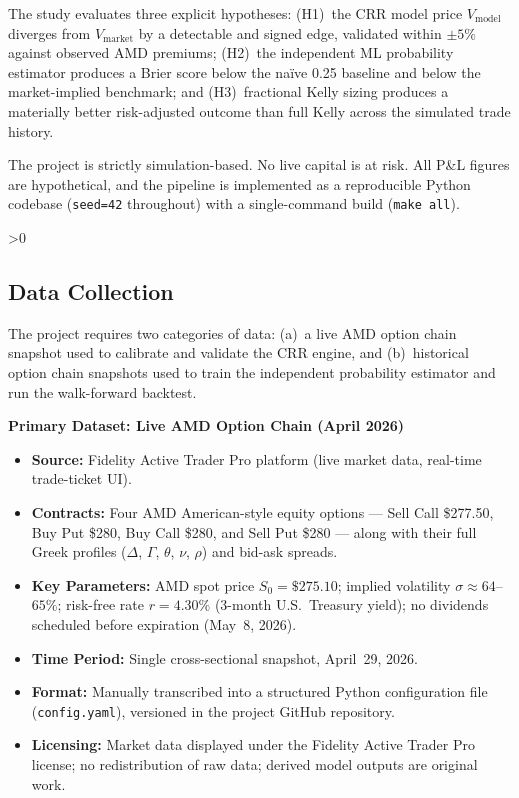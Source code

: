 \documentclass[12pt, letterpaper]{article}
\let\oldsubsection\subsection
\renewcommand{\subsection}{%
  \ifnum\value{subsection}>0 \clearpage\fi
  \oldsubsection
}
\begin{document}
The study evaluates three explicit hypotheses: (H1)~the CRR model
price $V_{\text{model}}$ diverges from $V_{\text{market}}$ by a
detectable and signed edge, validated within $\pm 5\%$ against
observed AMD premiums; (H2)~the independent ML probability estimator
produces a Brier score below the na\"{i}ve 0.25 baseline and below
the market-implied benchmark; and (H3)~fractional Kelly sizing
produces a materially better risk-adjusted outcome than full Kelly
across the simulated trade history.

The project is strictly simulation-based. No live capital is at
risk. All P\&L figures are hypothetical, and the pipeline is
implemented as a reproducible Python codebase (\texttt{seed=42}
throughout) with a single-command build (\texttt{make all}).

\subsection{Data Collection}

The project requires two categories of data: (a)~a live AMD option
chain snapshot used to calibrate and validate the CRR engine, and
(b)~historical option chain snapshots used to train the independent
probability estimator and run the walk-forward backtest.

\medskip
\noindent\textbf{Primary Dataset: Live AMD Option Chain (April 2026)}
\begin{itemize}
  \item \textbf{Source:} Fidelity Active Trader Pro platform (live
        market data, real-time trade-ticket UI).
  \item \textbf{Contracts:} Four AMD American-style equity options
        --- Sell Call \$277.50, Buy Put \$280, Buy Call \$280, and
        Sell Put \$280 --- along with their full Greek profiles
        ($\Delta$, $\Gamma$, $\theta$, $\nu$, $\rho$) and bid-ask
        spreads.
  \item \textbf{Key Parameters:} AMD spot price $S_0 = \$275.10$;
        implied volatility $\sigma \approx 64$--$65\%$; risk-free
        rate $r = 4.30\%$ (3-month U.S.\ Treasury yield); no
        dividends scheduled before expiration (May~8, 2026).
  \item \textbf{Time Period:} Single cross-sectional snapshot,
        April~29, 2026.
  \item \textbf{Format:} Manually transcribed into a structured
        Python configuration file (\texttt{config.yaml}), versioned
        in the project GitHub repository.
  \item \textbf{Licensing:} Market data displayed under the Fidelity
        Active Trader Pro license; no redistribution of raw data;
        derived model outputs are original work.
\end{itemize}
\end{document}
